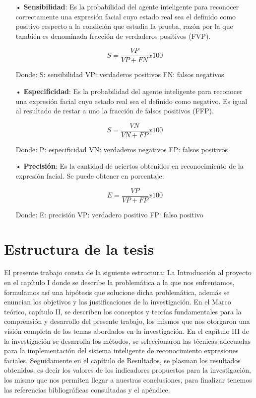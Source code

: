 \begin{itemize}
\item[•] {\bf Sensibilidad}: Es la probabilidad del agente inteligente para reconocer correctamente una expresión facial cuyo estado real sea el definido como positivo respecto a la condición que estudia la prueba, razón por la que también es denominada fracción de verdaderos positivos (FVP).

\begin{equation}
 S = \frac{VP}{VP+FN} x 100
\end{equation}

Donde: \vskip 0.1cm
S: sensibilidad \vskip 0.1cm
VP: verdaderos positivos \vskip 0.1cm
FN: falsos negativos

\item[•] {\bf Especificidad}: Es la probabilidad del agente inteligente para reconocer una expresión facial cuyo estado real sea el definido como negativo. Es igual al resultado de restar a uno la fracción de falsos positivos (FFP).

\begin{equation}
 S = \frac{VN}{VN+FP} x 100
\end{equation}	

Donde: \vskip 0.1cm
P: especificidad \vskip 0.1cm
VN: verdaderos negativos \vskip 0.1cm
FP: falsos positivos

\item[•] {\bf Precisión}: Es la cantidad de aciertos obtenidos en reconocimiento de la expresión facial. Se puede obtener en porcentaje:

\begin{equation}
 E = \frac{VP}{VP+FP} x 100
\end{equation}	

\vskip 1.5cm

Donde: \vskip 0.1cm
E: precisión \vskip 0.1cm
VP: verdadero positivo \vskip 0.1cm
FP: falso positivo	

\end{itemize}

\section{Estructura de la tesis}

El presente trabajo consta de la siguiente estructura: La Introducción al proyecto en el capítulo I donde se describe la problemática a la que nos enfrentamos, formulamos así una hipótesis que solucione dicha problemática, además se enuncian los objetivos y las justificaciones de la investigación. En el Marco teórico, capítulo II, se describen los conceptos y teorías fundamentales para la comprensión y desarrollo del presente trabajo, los mismos que nos otorgaron una visión completa de los temas abordados en la investigación. En el capítulo III de la investigación se desarrolla los métodos, se seleccionaron las técnicas adecuadas para la implementación del sistema inteligente de reconocimiento expresiones faciales. Seguidamente en el capítulo de Resultados, se plasman los resultados obtenidos, es decir los valores de los indicadores propuestos para la investigación, los mismo que nos permiten llegar a nuestras conclusiones, para finalizar tenemos las referencias bibliográficas consultadas y el apéndice.

